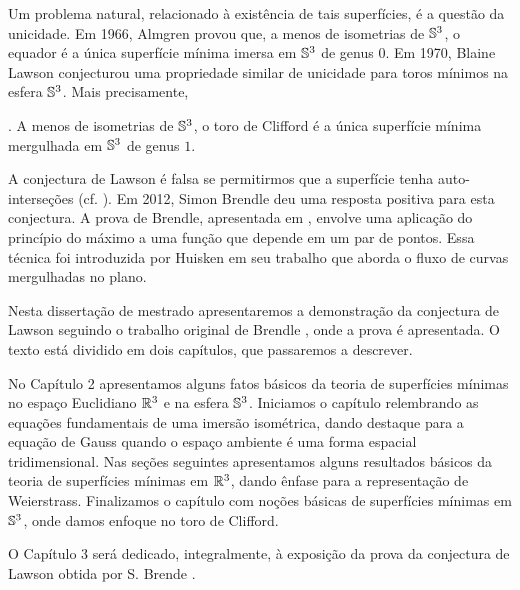 Um problema natural, relacionado \`a exist\^encia de tais superf\'icies,
\'e a quest\~ao da unicidade. Em 1966, Almgren \cite{Almgren1966} 
provou que, a menos de isometrias de $\mathbb{S}^3$, o equador \'e a \'unica
superf\'icie m\'inima imersa em $\mathbb{S}^3$ de genus $0$.
Em 1970, Blaine Lawson \cite{Lawson1970a} conjecturou uma 
propriedade similar de unicidade para toros m\'inimos na esfera
$\mathbb{S}^3$. Mais precisamente,

\begin{conjectura}\label{teo:Lawson}
	\cite{Lawson1970a}. A menos de isometrias de $\mathbb{S}^3$, o toro de Clifford \'e a \'unica 
	superf\'icie m\'inima mergulhada em $\mathbb{S}^3$ de genus $1$.
\end{conjectura}

A conjectura de Lawson \'e falsa se permitirmos que a superf\'icie
tenha auto-interse\c c\~oes (cf. \cite{Lawson1969}). Em 2012, 
Simon Brendle deu uma resposta positiva para esta conjectura. 
A prova de Brendle, apresentada em \cite{Brendle2013a}, envolve
uma aplica\c c\~ao do princ\'ipio do m\'aximo a uma fun\c c\~ao 
que depende em um par de pontos. Essa t\'ecnica foi introduzida
por Huisken \cite{Huisken1998} em seu trabalho que aborda o 
fluxo de curvas mergulhadas no plano.

Nesta disserta\c c\~ao de mestrado apresentaremos a 
demonstra\c c\~ao da conjectura de Lawson seguindo
o trabalho original de Brendle \cite{Brendle2013a}, onde
a prova \'e apresentada. O texto est\'a dividido em dois
cap\'itulos, que passaremos a descrever.

No Cap\'itulo 2 apresentamos alguns fatos b\'asicos da
teoria de superf\'icies m\'inimas no espa\c co Euclidiano
$\mathbb{R}^3$ e na esfera $\mathbb{S}^3$. Iniciamos o cap\'itulo 
relembrando as equa\c c\~oes fundamentais de uma 
imers\~ao isom\'etrica, dando destaque para a equa\c c\~ao
de Gauss quando o espa\c co ambiente \'e uma forma 
espacial tridimensional. Nas se\c c\~oes seguintes 
apresentamos alguns resultados b\'asicos da teoria de
superf\'icies m\'inimas em $\mathbb{R}^3$, dando \^enfase para
a representa\c c\~ao de Weierstrass. Finalizamos o
cap\'itulo com no\c c\~oes b\'asicas de superf\'icies 
m\'inimas em $\mathbb{S}^3$, onde damos enfoque no toro de
Clifford.

O Cap\'itulo 3 ser\'a dedicado, integralmente, \`a exposi\c c\~ao
da prova da conjectura de Lawson obtida por S. Brende
\cite{Brendle2013a}.
